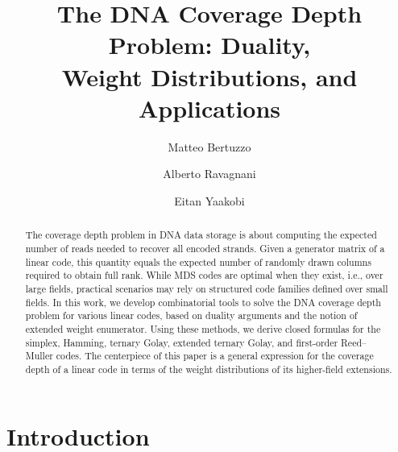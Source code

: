 \documentclass[11pt,a4paper,reqno,twoside]{article}
\title{The DNA Coverage Depth Problem: Duality, \\ Weight Distributions, and Applications}
\author[1]{Matteo Bertuzzo}
\author[1]{Alberto Ravagnani}
\author[2]{Eitan Yaakobi}
\affil[1]{Eindhoven University of Technology, Eindhoven, The Netherlands}
\affil[2]{Technion -- Israel Institute of Technology, Haifa, Israel}
\theoremstyle{definition}
\begin{document}
\maketitle

\renewcommand{\thefootnote}{\fnsymbol{footnote}}
\renewcommand{\thefootnote}{\arabic{footnote}}



\begin{abstract}
The coverage depth problem in DNA data storage is about computing the expected number of reads needed to recover all encoded strands. Given a  generator matrix of a linear code, this quantity equals the expected number of randomly drawn columns required to obtain full rank. While MDS codes are optimal when they exist, i.e., over large fields, practical scenarios may rely on structured code families defined over small fields.
In this work, we develop combinatorial tools to 
solve the DNA coverage depth problem for various linear codes, based on duality arguments and the notion of extended weight enumerator. Using these methods, we derive closed formulas for the simplex, Hamming, ternary Golay, extended ternary Golay, and first‑order Reed–Muller codes. The centerpiece of this paper is a general expression for the coverage depth of a linear code in terms of the weight distributions of its higher-field extensions.  
\end{abstract}

\medskip

\section{Introduction}
\end{document}
